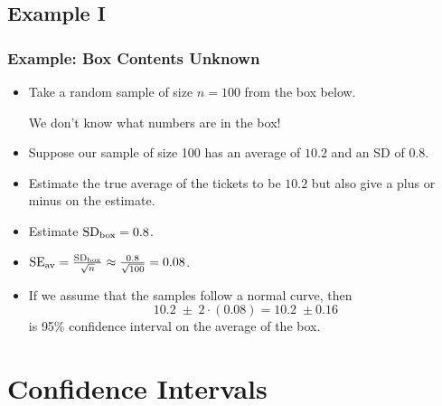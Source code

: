\documentclass[t]{beamer}
\begin{document}
\subsection{Example I}
\begin{frame}
\frametitle{Example:  Box Contents Unknown}

\footnotesize

\begin{itemize}
\item<2-> Take a random sample of size $n=100$ from the box below.\vspace{-2pt}
\begin{center}
\end{center}
We don't know what numbers are in the box!
\item<3->  Suppose our sample of size 100 has an average of $10.2$ and an SD of $0.8$.  
\item<4->  Estimate the true average of the tickets to be $10.2$ but also give  a plus or minus on the 
    estimate.
\item<5->  {\color{blue}Estimate} $\mbox{SD}_{\mbox{\scriptsize box}}=0.8$.
\item<5-> 
  $\mbox{SE}_{\mbox{\scriptsize av}}=
    \frac{\scriptsize\mbox{SD}_{\mbox{\tiny box}}}{\sqrt{n}}\approx 
    \frac{0.8}{\sqrt{100}} = 0.08$.
\item<6-> If we assume that the samples follow a normal curve, then 
\[10.2\; \pm\; 2\cdot (0.08) = 10.2\; \pm 0.16\]
is {\color{blue}95\% confidence interval} on the average of the box.
\end{itemize}

\end{frame}

\section{Confidence Intervals}
\end{document}

